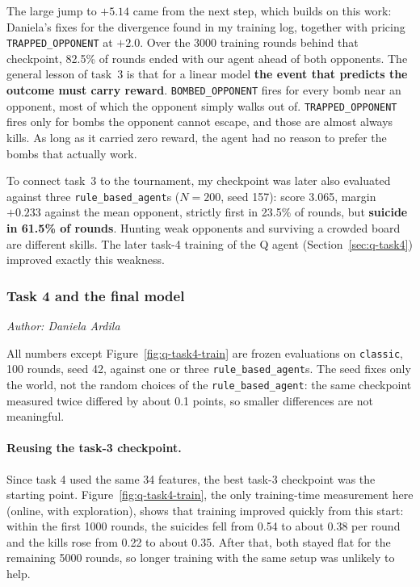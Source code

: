 \documentclass[11pt]{article}
\newcommand{\authorline}[1]{\noindent\textit{Author: #1}\par\medskip}
\newcommand{\code}[1]{\texttt{#1}}
\begin{document}
The large jump to $+5.14$ came from the next step, which builds on this work: Daniela's fixes for the divergence found in my training log, together with pricing \code{TRAPPED\_OPPONENT} at $+2.0$. Over the 3000 training rounds behind that checkpoint, 82.5\% of rounds ended with our agent ahead of both opponents. The general lesson of task~3 is that for a linear model \textbf{the event that predicts the outcome must carry reward}. \code{BOMBED\_OPPONENT} fires for every bomb near an opponent, most of which the opponent simply walks out of. \code{TRAPPED\_OPPONENT} fires only for bombs the opponent cannot escape, and those are almost always kills. As long as it carried zero reward, the agent had no reason to prefer the bombs that actually work.

To connect task~3 to the tournament, my checkpoint was later also evaluated against three \code{rule\_based\_agent}s ($N = 200$, seed 157): score 3.065, margin $+0.233$ against the mean opponent, strictly first in 23.5\% of rounds, but \textbf{suicide in 61.5\% of rounds}. Hunting weak opponents and surviving a crowded board are different skills. The later task-4 training of the Q agent (Section~\ref{sec:q-task4}) improved exactly this weakness.


\subsubsection{Task 4 and the final model}
\label{sec:q-res-task4}
\authorline{Daniela Ardila}
 
All numbers except Figure~\ref{fig:q-task4-train} are frozen evaluations on
\code{classic}, 100 rounds, seed 42, against one or three \code{rule\_based\_agent}s. The seed fixes only the world, not the random
choices of the \code{rule\_based\_agent}: the same checkpoint measured twice differed by
about 0.1 points, so smaller differences are not meaningful.
 
\paragraph{Reusing the task-3 checkpoint.} Since task 4 used the same 34 features, the
best task-3 checkpoint was the starting point. Figure~\ref{fig:q-task4-train}, the only
training-time measurement here (online, with exploration), shows that training improved
quickly from this start: within the first 1000 rounds, the suicides fell from 0.54
to about 0.38 per round and the kills rose from 0.22 to about 0.35. After that, both
stayed flat for the remaining 5000 rounds, so longer training with the same setup was
unlikely to help.
 
\end{document}
